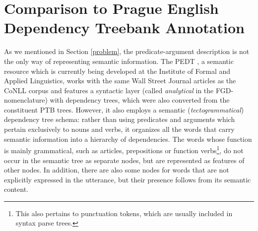 \documentclass[12pt,notitlepage,a4paper]{report}
\begin{document}
\section{Comparison to Prague English Dependency Treebank Annotation}\label{pedt}

As we mentioned in Section \ref{problem}, the predicate-argument description is not the only way of representing semantic information. The PEDT \citep{cinkova09}, a semantic resource which is currently being developed at the Institute of Formal and Applied Linguistics, works with the same Wall Street Journal articles as the CoNLL corpus and features a syntactic layer (called \emph{analytical} in the FGD-nomenclature) with dependency trees, which were also converted from the constituent PTB trees. However, it also employs a semantic (\emph{tectogrammatical}) dependency tree schema: rather than using predicates and arguments which pertain exclusively to nouns and verbs, it organizes all the words that carry semantic information into a hierarchy of dependencies. The words whose function is mainly grammatical, such as articles, prepositions or function verbs\footnote{This also pertains to punctuation tokens, which are usually included in syntax parse trees.}, do not occur in the semantic tree as separate nodes, but are represented as features of other nodes. In addition, there are also some nodes for words that are not explicitly expressed in the utterance, but their presence follows from its semantic content.
\end{document}
